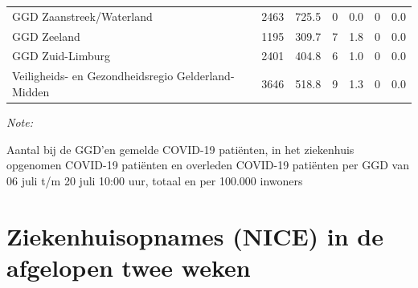 \documentclass[
  english,
  man,floatsintext]{apa6}
\begin{document}
\begin{table}
\begin{threeparttable}
\begin{tabular}{lrrrrrr}
GGD Zaanstreek/Waterland & 2463 & 725.5 & 0 & 0.0 & 0 & 0.0\\
GGD Zeeland & 1195 & 309.7 & 7 & 1.8 & 0 & 0.0\\
GGD Zuid-Limburg & 2401 & 404.8 & 6 & 1.0 & 0 & 0.0\\
Veiligheids- en Gezondheidsregio Gelderland-Midden & 3646 & 518.8 & 9 & 1.3 & 0 & 0.0\\
\bottomrule
\end{tabular}
\begin{tablenotes}
\item \textit{Note: } 
\item Aantal bij de GGD’en gemelde COVID-19 patiënten, in het ziekenhuis opgenomen COVID-19 patiënten en overleden COVID-19 patiënten per GGD van 06 juli t/m 20 juli 10:00 uur, totaal en per 100.000 inwoners
\end{tablenotes}
\end{threeparttable}
\endgroup{}
\end{table}

\newpage

\hypertarget{ziekenhuisopnames-nice-in-de-afgelopen-twee-weken}{%
\section{Ziekenhuisopnames (NICE) in de afgelopen twee weken}\label{ziekenhuisopnames-nice-in-de-afgelopen-twee-weken}}
\end{document}
